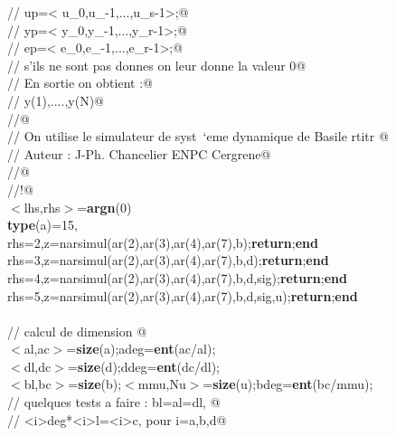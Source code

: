{\begin{flushleft}
{\cmarg \verb@//      up=< u\_0,u\_{-1},...,u\_{s-1}>;@\\ 
\cmarg \verb@//      yp=< y\_0,y\_{-1},...,y\_{r-1}>;@\\ 
\cmarg \verb@//      ep=< e\_0,e\_{-1},...,e\_{r-1}>;@\\ 
\cmarg \verb@//      s'ils ne sont pas donnes on leur donne la valeur 0@\\ 
\cmarg \verb@// En sortie on obtient :@\\ 
\cmarg \verb@//      y(1),....,y(N)@\\ 
\cmarg \verb@//@\\ 
\cmarg \verb@// On utilise le simulateur de syst\ `eme dynamique de Basile rtitr @\\ 
\cmarg \verb@// Auteur : J-Ph. Chancelier ENPC Cergrene@\\ 
\cmarg \verb@//@\\ 
\cmarg \verb@//!@\\ 
\cmarg $<$lhs,rhs$>$={\bf argn}(0)\\ 
 {\bf type}(a)=15,\\ 
\cmarg \hspace{0.8cm}{\bf if} rhs=2,z=narsimul(ar(2),ar(3),ar(4),ar(7),b);{\bf return};{\bf end}\\ 
\cmarg \hspace{0.8cm}{\bf if} rhs=3,z=narsimul(ar(2),ar(3),ar(4),ar(7),b,d);{\bf return};{\bf end}\\ 
\cmarg \hspace{0.8cm}{\bf if} rhs=4,z=narsimul(ar(2),ar(3),ar(4),ar(7),b,d,sig);{\bf return};{\bf end}\\ 
\cmarg \hspace{0.8cm}{\bf if} rhs=5,z=narsimul(ar(2),ar(3),ar(4),ar(7),b,d,sig,u);{\bf return};{\bf end}\\ 
 \\ 
\cmarg \verb@// calcul de dimension @\\ 
\cmarg \hspace{0.8cm}$<$al,ac$>$={\bf size}(a);adeg={\bf ent}(ac/al);\\ 
\cmarg \hspace{0.8cm}$<$dl,dc$>$={\bf size}(d);ddeg={\bf ent}(dc/dl);\\ 
\cmarg \hspace{0.8cm}$<$bl,bc$>$={\bf size}(b);$<$mmu,Nu$>$={\bf size}(u);bdeg={\bf ent}(bc/mmu);\\ 
\cmarg \verb@// quelques tests a faire : bl=al=dl, @\\ 
\cmarg \verb@// <i>deg*<i>l=<i>c, pour i=a,b,d@\\ 
}
\end{flushleft}}
